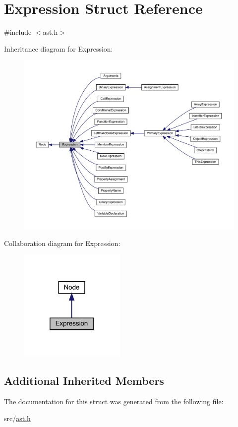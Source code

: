 \hypertarget{struct_expression}{}\section{Expression Struct Reference}
\label{struct_expression}


{\ttfamily \#include $<$ast.\+h$>$}



Inheritance diagram for Expression\+:\nopagebreak
\begin{figure}[H]
\begin{center}
\leavevmode
\includegraphics[width=350pt]{struct_expression__inherit__graph}
\end{center}
\end{figure}


Collaboration diagram for Expression\+:\nopagebreak
\begin{figure}[H]
\begin{center}
\leavevmode
\includegraphics[width=145pt]{struct_expression__coll__graph}
\end{center}
\end{figure}
\subsection*{Additional Inherited Members}


The documentation for this struct was generated from the following file\+:\begin{DoxyCompactItemize}
\item 
src/\hyperlink{ast_8h}{ast.\+h}\end{DoxyCompactItemize}
